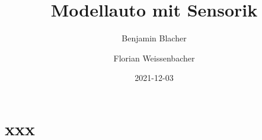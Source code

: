\documentclass[14pt]{beamer}
\author{Benjamin Blacher \and Florian Weissenbacher}
\title{Modellauto mit Sensorik}
\date{2021-12-03}
\begin{document}
\section{xxx}
\begin{frame}
\titlepage
\end{frame}

\end{document}
